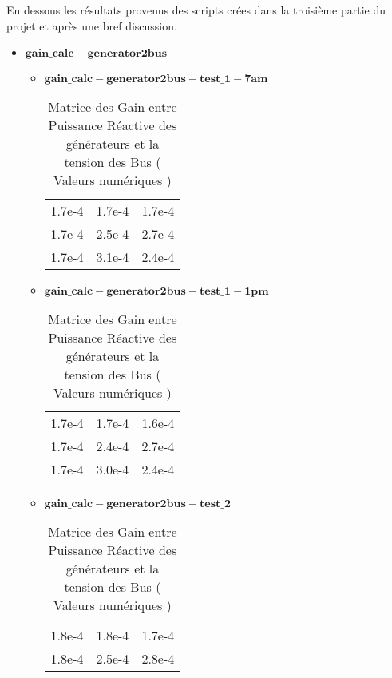 En dessous les résultats provenus des scripts crées dans la troisième partie du projet et après une bref discussion. 

\begin{itemize}
\item $\mathbf{gain\_calc-generator2bus}$\\
\begin{itemize}
	
\item $\mathbf{gain\_calc-generator2bus-test\_1-7am}$
\begin{table}[H]
	\captionsetup{justification=centering,margin=2cm}
	\caption{Matrice des Gain entre Puissance Réactive des générateurs et la tension des Bus ( Valeurs numériques )}
	\centering
	\begin{tabular}{ccc}
		1.7e-4&1.7e-4&1.7e-4\\
		1.7e-4&2.5e-4&2.7e-4\\
		1.7e-4&3.1e-4&2.4e-4\\
	\end{tabular}
\end{table}

\item $\mathbf{gain\_calc-generator2bus-test\_1-1pm}$
\begin{table}[H]
	\captionsetup{justification=centering,margin=2cm}
	\caption{Matrice des Gain entre Puissance Réactive des générateurs et la tension des Bus ( Valeurs numériques )}
	\centering
	\begin{tabular}{ccc}
		1.7e-4&1.7e-4&1.6e-4\\
		1.7e-4&2.4e-4&2.7e-4\\
		1.7e-4&3.0e-4&2.4e-4\\
	\end{tabular}
	
\end{table}
\newpage\vspace{2em}
\item $\mathbf{gain\_calc-generator2bus-test\_2}$
\begin{table}[H]
	\captionsetup{justification=centering,margin=2cm}
	\caption{Matrice des Gain entre Puissance Réactive des générateurs et la tension des Bus ( Valeurs numériques )}
	\centering
	\begin{tabular}{ccc}
		
		1.8e-4&1.8e-4&1.7e-4\\
		
		1.8e-4&2.5e-4&2.8e-4\\
		

\end{tabular}
\end{table}
\end{itemize}
\end{itemize}
